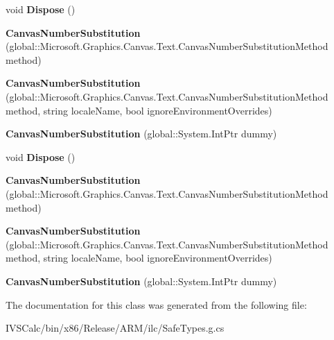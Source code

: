 \begin{DoxyCompactItemize}
void {\bfseries Dispose} ()
\item 
\mbox{\label{class_microsoft_1_1_graphics_1_1_canvas_1_1_text_1_1_canvas_number_substitution_a23cd618feea7309cd4c3797c2969e6f3}} 
{\bfseries Canvas\+Number\+Substitution} (global\+::\+Microsoft.\+Graphics.\+Canvas.\+Text.\+Canvas\+Number\+Substitution\+Method method)
\item 
\mbox{\label{class_microsoft_1_1_graphics_1_1_canvas_1_1_text_1_1_canvas_number_substitution_ae878982d7be90bf2b1ff752454f90f93}} 
{\bfseries Canvas\+Number\+Substitution} (global\+::\+Microsoft.\+Graphics.\+Canvas.\+Text.\+Canvas\+Number\+Substitution\+Method method, string locale\+Name, bool ignore\+Environment\+Overrides)
\item 
\mbox{\label{class_microsoft_1_1_graphics_1_1_canvas_1_1_text_1_1_canvas_number_substitution_a367a017a47cc1914c315d4594f461eaa}} 
{\bfseries Canvas\+Number\+Substitution} (global\+::\+System.\+Int\+Ptr dummy)
\item 
\mbox{\label{class_microsoft_1_1_graphics_1_1_canvas_1_1_text_1_1_canvas_number_substitution_ab79f8bfd20865299806189e031b32db1}} 
void {\bfseries Dispose} ()
\item 
\mbox{\label{class_microsoft_1_1_graphics_1_1_canvas_1_1_text_1_1_canvas_number_substitution_a23cd618feea7309cd4c3797c2969e6f3}} 
{\bfseries Canvas\+Number\+Substitution} (global\+::\+Microsoft.\+Graphics.\+Canvas.\+Text.\+Canvas\+Number\+Substitution\+Method method)
\item 
\mbox{\label{class_microsoft_1_1_graphics_1_1_canvas_1_1_text_1_1_canvas_number_substitution_ae878982d7be90bf2b1ff752454f90f93}} 
{\bfseries Canvas\+Number\+Substitution} (global\+::\+Microsoft.\+Graphics.\+Canvas.\+Text.\+Canvas\+Number\+Substitution\+Method method, string locale\+Name, bool ignore\+Environment\+Overrides)
\item 
\mbox{\label{class_microsoft_1_1_graphics_1_1_canvas_1_1_text_1_1_canvas_number_substitution_a367a017a47cc1914c315d4594f461eaa}} 
{\bfseries Canvas\+Number\+Substitution} (global\+::\+System.\+Int\+Ptr dummy)
\end{DoxyCompactItemize}


The documentation for this class was generated from the following file\+:\begin{DoxyCompactItemize}
\item 
I\+V\+S\+Calc/bin/x86/\+Release/\+A\+R\+M/ilc/Safe\+Types.\+g.\+cs\end{DoxyCompactItemize}
